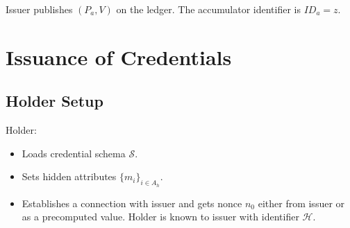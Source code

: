 Issuer publishes $(P_a,V)$ on the ledger. The accumulator identifier is $ID_a = z$.

\section{Issuance of Credentials}

\subsection{Holder Setup}

Holder:
\begin{itemize}
    \item Loads credential schema $\mathcal{S}$.
    \item Sets hidden attributes $\{m_i\}_{i \in A_h}$.
    \item Establishes a connection with issuer and gets nonce $n_0$ either from issuer or as a precomputed value. Holder is known to issuer with identifier $\mathcal{H}$.
\end{itemize}

